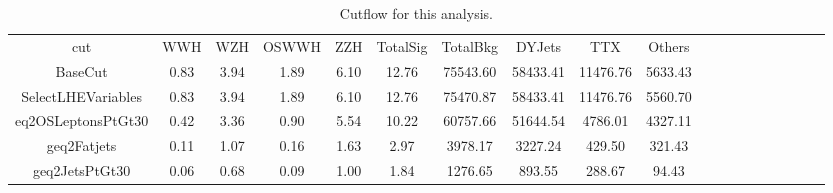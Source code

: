 \begin{table}[htp]
\begin{center}
\begin{tabular}{ccccccccccccccccccc}
\hline
\hline
       cut         & WWH  & WZH  & OSWWH &  ZZH  & TotalSig & TotalBkg &  DYJets  &   TTX    & Others  \\
     BaseCut       & 0.83 & 3.94 & 1.89  & 6.10  &  12.76   & 75543.60 & 58433.41 & 11476.76 & 5633.43 \\
SelectLHEVariables & 0.83 & 3.94 & 1.89  & 6.10  &  12.76   & 75470.87 & 58433.41 & 11476.76 & 5560.70 \\
eq2OSLeptonsPtGt30 & 0.42 & 3.36 & 0.90  & 5.54  &  10.22   & 60757.66 & 51644.54 & 4786.01  & 4327.11 \\
   geq2Fatjets     & 0.11 & 1.07 & 0.16  & 1.63  &   2.97   & 3978.17  & 3227.24  &  429.50  & 321.43  \\
  geq2JetsPtGt30   & 0.06 & 0.68 & 0.09  & 1.00  &   1.84   & 1276.65  &  893.55  &  288.67  &  94.43  \\
\hline
\hline
\end{tabular}
\end{center}
\caption{Cutflow for this analysis.}
\label{tab:cutflow}
\end{table}
